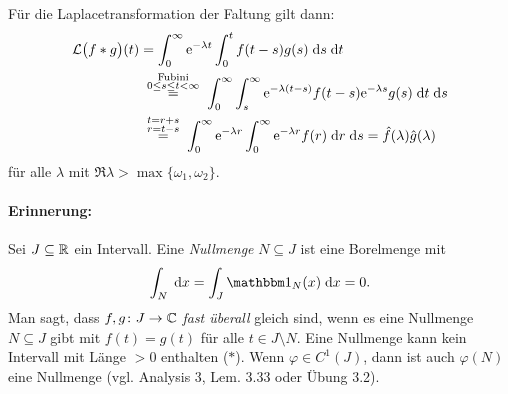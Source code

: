 \documentclass[a4paper,twoside,DIV15,BCOR12mm]{scrbook}
\begin{document}
Für die Laplacetransformation der Faltung gilt dann:
\begin{align} \label{4.7}
  \mathcal{L}\bigl(f*g\bigr)(t) &= \integral{0}{\infty}{\e^{-\lambda t}\integral{0}{t}{f(t-s)g(s)}{s}}{t} \notag \\
  &\wegen{=}{\substack{\text{Fubini}\\0\le s\le t<\infty}} \integral{0}{\infty}{\integral{s}{\infty}{\e^{-\lambda(t-s)} f(t-s)
      \e^{-\lambda s} g(s)}{t}}{s} \notag \\
  &\wegen{=}{\substack{t=r+s\\r=t-s}} \integral{0}{\infty}{\e^{-\lambda r}\integral{0}{\infty}{\e^{-\lambda r}f(r)}{r}}{s} =
  \hat{f}(\lambda) \hat{g}(\lambda)
\end{align}
für alle $\lambda$ mit $\Re{\lambda} > \max{\{\omega_1,\omega_2\}}$.

\paragraph{Erinnerung:} Sei $J\subseteq\mathbb{R}$ ein Intervall. Eine \emph{Nullmenge} $N\subseteq J$ ist eine Borelmenge mit \[
\integral{N}{}{}{x} = \integral{J}{}{\charfnkt{N}(x)}{x} = 0. \] Man sagt, dass $f, g\colon J\to\mathbb{C}$ \emph{fast überall} gleich
sind, wenn es eine Nullmenge $N\subseteq J$ gibt mit $f(t)=g(t)$ für alle $t\in J\setminus N$. Eine Nullmenge kann kein
Intervall mit Länge $>0$ enthalten ($*$). Wenn $\varphi\in C^1(J)$, dann ist auch $\varphi(N)$ eine Nullmenge (vgl. Analysis 3,
Lem. 3.33 oder Übung 3.2).
\end{document}
